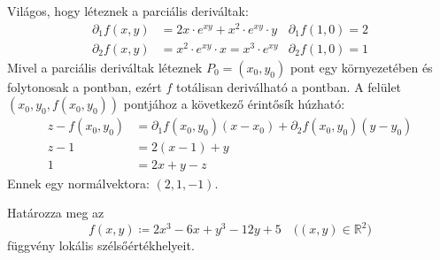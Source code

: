 \documentclass[a4paper,12pt]{article}
\begin{document}
\begin{solution}
	Világos, hogy léteznek a parciális deriváltak:
	\begin{align*}
		\partial_{1}{f(x,y)} &= 2x \cdot e^{xy} + x^2 \cdot e^{xy} \cdot y   &\partial_{1}{f(1,0)}=2 \\
		\partial_{2}{f(x,y)} &= x^2 \cdot e^{xy} \cdot x = x^3 \cdot e^{xy}  &\partial_{2}{f(1,0)}=1
	\end{align*}
	Mivel a parciális deriváltak léteznek $P_0 = (x_0,y_0)$ pont egy környezetében és folytonosak a pontban, ezért $f$ totálisan deriválható a pontban. A felület $(x_0,y_0,f(x_0,y_0))$ pontjához a következő érintősík húzható:
	\begin{align*}
		z - f(x_0,y_0) &= \partial_{1}{f(x_0,y_0)}(x-x_0) + \partial_{2}{f(x_0,y_0)}(y-y_0) \\
		z - 1 &= 2(x-1) + y \\
		1 &= 2x + y - z
	\end{align*}
	Ennek egy normálvektora: $(2,1,-1)$.
\end{solution}
\newpage
\begin{question}
	Határozza meg az
	\[
	f(x,y) \coloneq 2x^3 - 6x + y^3 - 12y + 5 \quad \bigl( (x,y) \in \mathbb{R}^2 \bigr)
	\]
	függvény lokális szélsőértékhelyeit.
\end{question}
\end{document}
